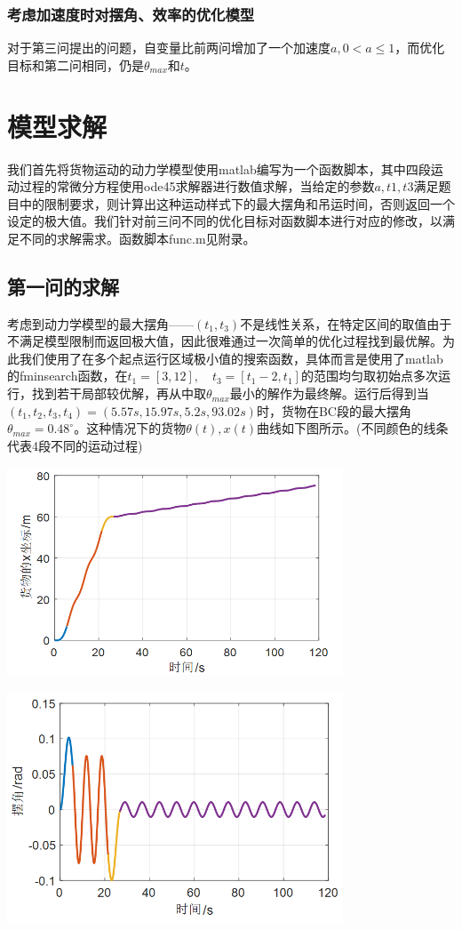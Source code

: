 \documentclass[withoutpreface,bwprint]{cumcmthesis} %
\begin{document}
\subsubsection{考虑加速度时对摆角、效率的优化模型}
对于第三问提出的问题，自变量比前两问增加了一个加速度$a, 0<a\leq1$，而优化目标和第二问相同，仍是$\theta_{max}$和$t$。

\section{模型求解}
我们首先将货物运动的动力学模型使用matlab编写为一个函数脚本，其中四段运动过程的常微分方程使用ode45求解器进行数值求解，当给定的参数$a,t1,t3$满足题目中的限制要求，则计算出这种运动样式下的最大摆角和吊运时间，否则返回一个设定的极大值。我们针对前三问不同的优化目标对函数脚本进行对应的修改，以满足不同的求解需求。函数脚本func.m见附录。

\subsection{第一问的求解}
考虑到动力学模型的最大摆角——$(t_1,t_3)$不是线性关系，在特定区间的取值由于不满足模型限制而返回极大值，因此很难通过一次简单的优化过程找到最优解。为此我们使用了在多个起点运行区域极小值的搜索函数，具体而言是使用了matlab的fminsearch函数，在$t_1=[3,12],\quad t_3=[t_1-2,t_1]$的范围均匀取初始点多次运行，找到若干局部较优解，再从中取$\theta_{max}$最小的解作为最终解。运行后得到当$(t_1,t_2,t_3,t_4)=(5.57s,15.97s,5.2s,93.02s)$时，货物在BC段的最大摆角$\theta_{max}=0.48^{\circ}$。这种情况下的货物$\theta(t),x(t)$曲线如下图所示。(不同颜色的线条代表4段不同的运动过程)

\centerline{\includegraphics[width=10cm]{p1x.png}}
\centerline{\includegraphics[width=10cm]{p1theta.png}}
\end{document}

